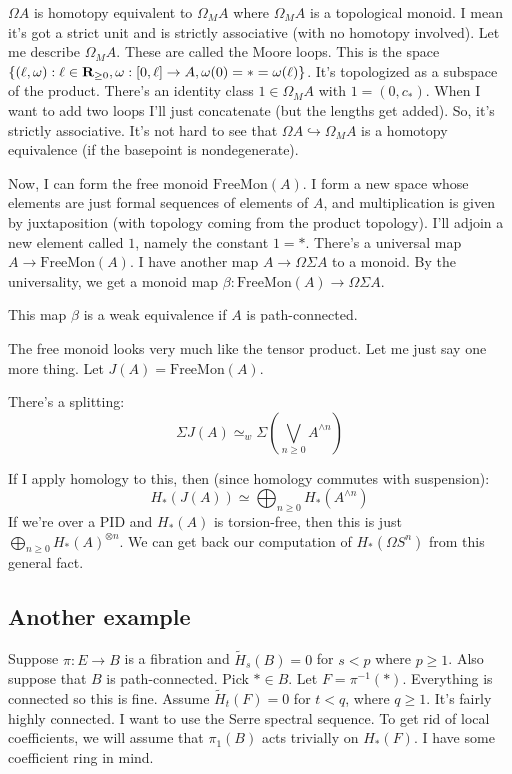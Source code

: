 \begin{remark}
    $\Omega A$ is homotopy equivalent to $\Omega_M A$ where $\Omega_M A$ is a topological monoid.
    I mean it's got a strict unit and is strictly associative (with no homotopy involved).
    Let me describe $\Omega_M A$.
    These are called the Moore loops.
    This is the space $\{(\ell,\omega):\ell\in\mathbf R_{\geq 0}, \omega:[0,\ell]\to A, \omega(0) = \ast = \omega(\ell)\}$.
    It's topologized as a subspace of the product.
    There's an identity class $1\in\Omega_M A$ with $1 = (0,c_\ast)$.
    When I want to add two loops I'll just concatenate (but the lengths get added).
    So, it's strictly associative.
    It's not hard to see that $\Omega A\hookrightarrow \Omega_M A$ is a homotopy equivalence (if the basepoint is nondegenerate).

    Now, I can form the free monoid $\mathrm{FreeMon}(A)$.
    I form a new space whose elements are just formal sequences of elements of $A$, and multiplication is given by juxtaposition (with topology coming from the product topology).
    I'll adjoin a new element called $1$, namely the constant $1 = \ast$.
    There's a universal map $A\to\mathrm{FreeMon}(A)$.
    I have another map $A\to\Omega\Sigma A$ to a monoid.
    By the universality, we get a monoid map $\beta:\mathrm{FreeMon}(A)\to\Omega\Sigma A$.
    \begin{theorem}[I. James]
	This map $\beta$ is a weak equivalence if $A$ is path-connected.
    \end{theorem}
    The free monoid looks very much like the tensor product.
    Let me just say one more thing.
    Let $J(A) = \mathrm{FreeMon}(A)$.
    \begin{theorem}
	There's a splitting:
	$$
	\Sigma J(A) \simeq_w \Sigma \left(\bigvee_{n\geq 0}A^{\wedge n}\right)
	$$
    \end{theorem}
    If I apply homology to this, then (since homology commutes with suspension):
    $$
    H_\ast(J(A)) \simeq \bigoplus_{n\geq 0} H_\ast(A^{\wedge n})
    $$
    If we're over a PID and $H_\ast(A)$ is torsion-free, then this is just $\bigoplus_{n\geq 0}H_\ast(A)^{\otimes n}$.
    We can get back our computation of $H_\ast(\Omega S^n)$ from this general fact.
\end{remark}
\subsection{Another example}
Suppose $\pi:E\to B$ is a fibration and $\widetilde{H}_s(B) = 0$ for $s<p$ where $p\geq 1$.
Also suppose that $B$ is path-connected.
Pick $\ast\in B$.
Let $F = \pi^{-1}(\ast)$.
Everything is connected so this is fine.
Assume $\widetilde{H}_t(F) = 0$ for $t<q$, where $q\geq 1$.
It's fairly highly connected.
I want to use the Serre spectral sequence.
To get rid of local coefficients, we will assume that $\pi_1(B)$ acts trivially on $H_\ast(F)$.
I have some coefficient ring in mind.

